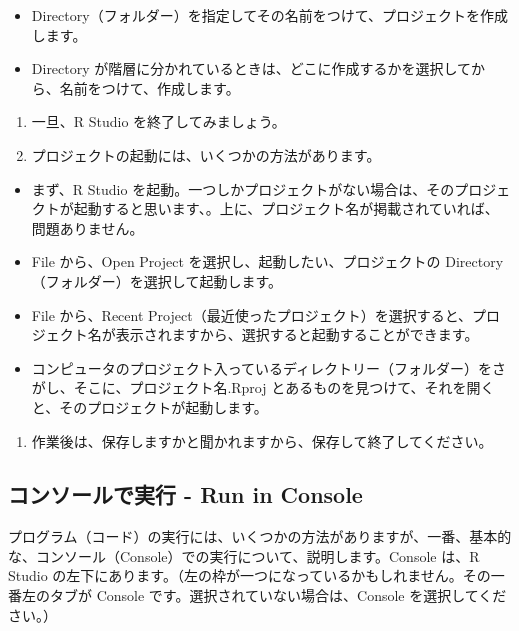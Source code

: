\documentclass[
]{bxjsbook}
\providecommand{\tightlist}{%
  \setlength{\itemsep}{0pt}\setlength{\parskip}{0pt}}
\theoremstyle{definition}
\theoremstyle{definition}
\theoremstyle{definition}
\theoremstyle{definition}
\theoremstyle{remark}
\begin{document}
\begin{itemize}
\tightlist
\item
  Directory（フォルダー）を指定してその名前をつけて、プロジェクトを作成します。
\item
  Directory が階層に分かれているときは、どこに作成するかを選択してから、名前をつけて、作成します。
\end{itemize}

\begin{enumerate}
\def\labelenumi{\arabic{enumi}.}
\setcounter{enumi}{2}
\item
  一旦、R Studio を終了してみましょう。
\item
  プロジェクトの起動には、いくつかの方法があります。
\end{enumerate}

\begin{itemize}
\tightlist
\item
  まず、R Studio を起動。一つしかプロジェクトがない場合は、そのプロジェクトが起動すると思います、。上に、プロジェクト名が掲載されていれば、問題ありません。
\item
  File から、Open Project を選択し、起動したい、プロジェクトの Directory（フォルダー）を選択して起動します。
\item
  File から、Recent Project（最近使ったプロジェクト）を選択すると、プロジェクト名が表示されますから、選択すると起動することができます。
\item
  コンピュータのプロジェクト入っているディレクトリー（フォルダー）をさがし、そこに、プロジェクト名.Rproj とあるものを見つけて、それを開くと、そのプロジェクトが起動します。
\end{itemize}

\begin{enumerate}
\def\labelenumi{\arabic{enumi}.}
\setcounter{enumi}{4}
\tightlist
\item
  作業後は、保存しますかと聞かれますから、保存して終了してください。
\end{enumerate}

\hypertarget{ux30b3ux30f3ux30bdux30fcux30ebux3067ux5b9fux884c---run-in-console}{%
\subsection{コンソールで実行 - Run in Console}\label{ux30b3ux30f3ux30bdux30fcux30ebux3067ux5b9fux884c---run-in-console}}

プログラム（コード）の実行には、いくつかの方法がありますが、一番、基本的な、コンソール（Console）での実行について、説明します。Console は、R Studio の左下にあります。（左の枠が一つになっているかもしれません。その一番左のタブが Console です。選択されていない場合は、Console を選択してください。）
\end{document}
